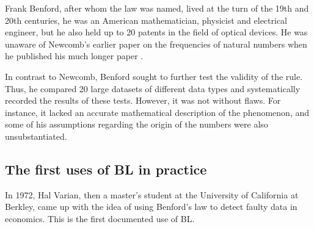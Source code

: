 
Frank Benford, after whom the law was named, lived at the turn of the 19th and 20th centuries, he was an American mathematician, physicist and electrical engineer, but he also held up to 20 patents in the field of optical devices. He was unaware of Newcomb's earlier paper on the frequencies of natural numbers when he published his much longer paper \emph{}. \cite{kossovsky2014benford}




In contrast to Newcomb, Benford sought to further test the validity of the rule. Thus, he compared 20 large datasets of different data types and systematically recorded the results of these tests. However, it was not without flaws. For instance, it lacked an accurate mathematical description of the phenomenon, and some of his assumptions regarding the origin of the numbers were also unsubstantiated. \cite{kossovsky2014benford}



\subsection{The first uses of BL in practice}  


In 1972, Hal Varian, then a master's student at the University of California at Berkley, came up with the idea of using Benford's law to detect faulty data in economics. This is the first documented use of BL. \cite{kossovsky2014benford} %


